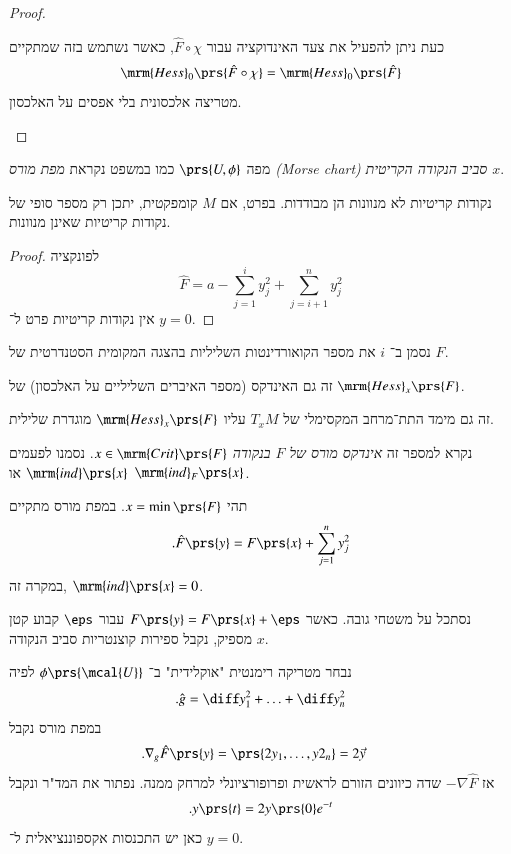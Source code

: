 \documentclass[a4paper,10pt,twoside,openany]{book}
\begin{document}
\begin{proof}
\begin{description}
כעת ניתן להפעיל את צעד האינדוקציה עבור
$\hat{F} \circ \chi$,
כאשר נשתמש בזה שמתקיים
\[\mrm{Hess}_0\prs{\hat{F} \circ \chi} = \mrm{Hess}_0\prs{\hat{F}}\]
מטריצה אלכסונית בלי אפסים על האלכסון.
\end{description}
\end{proof}

\begin{definition}
מפה
$\prs{U,\phi}$
כמו במשפט נקראת
\emph{מפת מורס
\textenglish{(Morse chart)}
סביב הנקודה הקריטית
$x$}.
\end{definition}

\begin{corollary}
נקודות קריטיות לא מנוונות הן מבודדות.
בפרט, אם
$M$
קומפקטית, יתכן רק מספר סופי של נקודות קריטיות שאינן מנוונות.
\end{corollary}

\begin{proof}
לפונקציה
\[\hat{F} = a - \sum_{j=1}^i y_j^2 + \sum_{j=i+1}^n y_j^2\]
אין נקודות קריטיות פרט ל־%
$y=0$.
\end{proof}

\begin{definition}
נסמן ב־%
$i$
את מספר הקואורדינטות השליליות בהצגה המקומית הסטנדרטית של
$F$.

זה גם האינדקס
(מספר האיברים השליליים על האלכסון)
של
$\mrm{Hess}_x\prs{F}$.

זה גם מימד התת־מרחב המקסימלי של
$T_x M$
עליו
$\mrm{Hess}_x\prs{F}$
מוגדרת שלילית.

נקרא למספר זה
\emph{אינדקס מורס של
$F$
בנקודה
$x \in \mrm{Crit}\prs{F}$}.
נסמנו לפעמים
$\mrm{ind}\prs{x}$
או
$\mrm{ind}_F\prs{x}$.
\end{definition}

\begin{example}
תהי
$x = \min\prs{F}$.
במפת מורס מתקיים
\begin{align*}
\text{.} \hat{F}\prs{y} = F\prs{x} + \sum_{j=1}^n y_j^2
\end{align*}
במקרה זה,
$\mrm{ind}\prs{x} = 0$.

נסתכל על משטחי גובה.
כאשר
$F\prs{y} = F\prs{x} + \eps$
עבור
$\eps$
קבוע קטן מספיק, נקבל ספירות קוצנטריות סביב הנקודה
$x$.

נבחר מטריקה רימנטית "אוקלידית" ב־%
$\phi\prs{\mcal{U}}$
לפיה
\[\text{.} \hat{g} = \diff y_1^2 + \ldots + \diff y_n^2\]
במפת מורס נקבל
\begin{align*}
\text{.} \nabla_g \hat{F}\prs{y} &= \prs{2y_1, \ldots, y 2_n} = 2 \vec{y}
\end{align*}
אז
$-\nabla \hat{F}$
שדה כיוונים הזורם לראשית ופרופורציונלי למרחק ממנה.
נפתור את המד"ר ונקבל
\begin{align*}
\text{.} y\prs{t} = 2 y\prs{0} e^{-t}
\end{align*}
כאן יש התכנסות אקספוננציאלית ל־%
$y = 0$.
\end{example}
\end{document}
